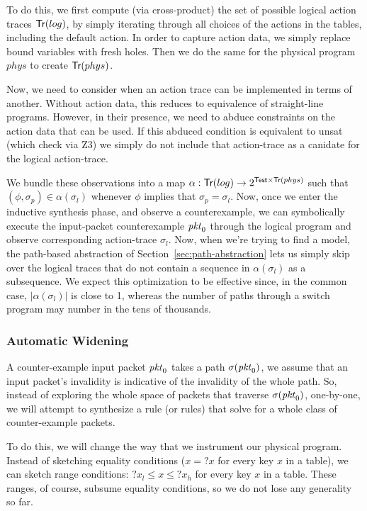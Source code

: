 To do this, we first compute (via cross-product) the set of possible
logical action traces $\mathop{\mathsf{Tr}}(log)$, by simply iterating through all
choices of the actions in the tables, including the default action. In
order to capture action data, we simply replace bound variables with
fresh holes. Then we do the same for the physical program $phys$ to
create $\mathop{\mathsf{Tr}}(phys)$.

Now, we need to consider when an action trace can be implemented in
terms of another. Without action data, this reduces to equivalence of
straight-line programs. However, in their presence, we need to abduce
constraints on the action data that can be used. If this abduced
condition is equivalent to unsat (which check via Z3) we simply do not
include that action-trace as a canidate for the logical action-trace.

We bundle these observations into a map
$\alpha : \mathop{\mathsf{Tr}}(log) \to 2^{\mathsf{Test} \times \mathop{\mathsf{Tr}}(phys)}$ such that
$(\phi, \sigma_p) \in \alpha(\sigma_l)$ whenever $\phi$ implies that
$\sigma_p = \sigma_l$. Now, once we enter the inductive synthesis
phase, and observe a counterexample, we can symbolically execute the
input-packet counterexample $\mathit{pkt}_0$ through the logical program and
observe corresponding action-trace $\sigma_l$. Now, when we're trying
to find a model, the path-based abstraction of
Section~\ref{sec:path-abstraction} lets us simply skip over the
logical traces that do not contain a sequence in $\alpha(\sigma_l)$ as
a subsequence. We expect this optimization to be effective since, in
the common case, $|\alpha(\sigma_l)|$ is close to 1, whereas the
number of paths through a switch program may number in the tens of
thousands.


\subsubsection{Automatic Widening}

A counter-example input packet $\mathit{pkt}_0$ takes a path $\sigma(\mathit{pkt}_0)$,
we assume that an input packet's invalidity is indicative of the
invalidity of the whole path. So, instead of exploring the whole space
of packets that traverse $\sigma(\mathit{pkt}_0)$, one-by-one, we will attempt
to synthesize a rule (or rules) that solve for a whole class of
counter-example packets.


To do this, we will change the way that we instrument our physical
program. Instead of sketching equality conditions ($x = ?x$ for every
key $x$ in a table), we can sketch range conditions:
$?x_{l}\leq x \leq ?x_{h}$ for every key $x$ in a table. These ranges,
of course, subsume equality conditions, so we do not lose any
generality so far.


